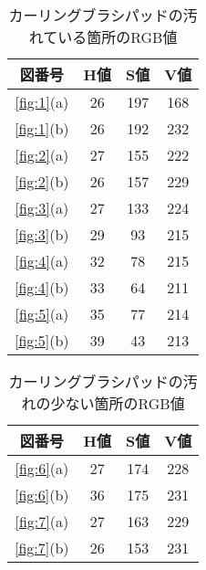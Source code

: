 \documentclass[main]{subfiles}
\begin{document}
\begin{table}[h]
    \caption{カーリングブラシパッドの汚れている箇所のRGB値}
    \label{table:HSV1}
    \centering
\begin{tabular}{c|c|c|c}
    図番号 & H値 & S値 & V値 \\ \hline
   \ref{fig:1}(a) & 26 & 197 & 168 \\ \hline
   \ref{fig:1}(b) & 26 & 192 & 232 \\ \hline\hline
   \ref{fig:2}(a) & 27 & 155 & 222 \\ \hline
   \ref{fig:2}(b) & 26 & 157 & 229 \\ \hline
   \ref{fig:3}(a) & 27 & 133 & 224 \\ \hline
   \ref{fig:3}(b) & 29 & 93 & 215 \\ \hline\hline
   \ref{fig:4}(a) & 32 & 78 & 215 \\ \hline
   \ref{fig:4}(b) & 33 & 64 & 211 \\ \hline
   \ref{fig:5}(a) & 35 & 77 & 214 \\ \hline
   \ref{fig:5}(b) & 39 & 43 & 213 \\
\end{tabular}    
\end{table}

\begin{table}[h]
    \caption{カーリングブラシパッドの汚れの少ない箇所のRGB値}
    \label{table:RGB2}
    \centering
\begin{tabular}{c|c|c|c}
    図番号 & H値 & S値 & V値 \\ \hline
   \ref{fig:6}(a) & 27 & 174 & 228 \\ \hline
   \ref{fig:6}(b) & 36 & 175 & 231 \\ \hline\hline
   \ref{fig:7}(a) & 27 & 163 & 229 \\ \hline
   \ref{fig:7}(b) & 26 & 153 & 231 \\ 
\end{tabular}    
\end{table}
\end{document}
